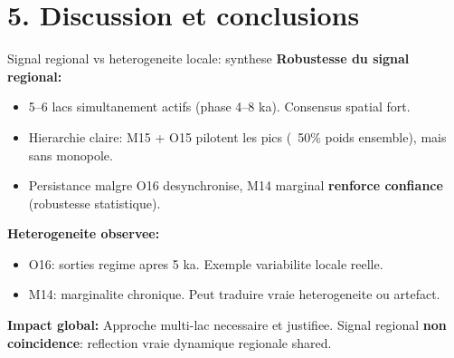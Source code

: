 \documentclass[aspectratio=169,11pt]{beamer}
\begin{document}
\section{5. Discussion et conclusions}

\begin{frame}{Signal regional vs heterogeneite locale: synthese}
\textbf{Robustesse du signal regional:}
\begin{itemize}
  \item 5--6 lacs simultanement actifs (phase 4--8 ka). Consensus spatial fort.
  
  \item Hierarchie claire: M15 + O15 pilotent les pics (~50\% poids ensemble), mais sans monopole.
  
  \item Persistance malgre O16 desynchronise, M14 marginal \textbf{renforce confiance} (robustesse statistique).
\end{itemize}

\textbf{Heterogeneite observee:}
\begin{itemize}
  \item O16: sorties regime apres 5 ka. Exemple variabilite locale reelle.
  
  \item M14: marginalite chronique. Peut traduire vraie heterogeneite ou artefact.
\end{itemize}

\textbf{Impact global:} Approche multi-lac necessaire et justifiee. Signal regional \textbf{non coincidence}: reflection vraie dynamique regionale shared.
\end{frame}
\end{document}
